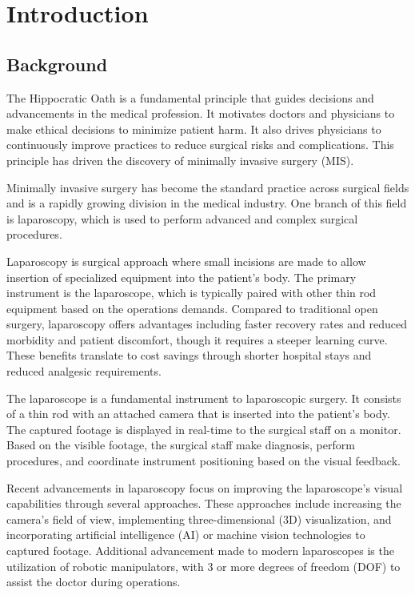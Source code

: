 \chapter{Introduction}

\section{Background}
\label{sec:Background}

The Hippocratic Oath is a fundamental principle that guides decisions and advancements in the medical profession. It motivates doctors and physicians to make ethical decisions to minimize patient harm. It also drives physicians to continuously improve practices to reduce surgical risks and complications. This principle has driven the discovery of minimally invasive surgery (MIS). \citep{FIS-2021}

\vspace{0.5cm}
\noindent
Minimally invasive surgery has become the standard practice across surgical fields and is a rapidly growing division in the medical industry. One branch of this field is laparoscopy, which is used to perform advanced and complex surgical procedures. \citep{FIS-2021}

\vspace{0.5cm}
\noindent
Laparoscopy is surgical approach where small incisions are made to allow insertion of specialized equipment into the patient’s body. The primary instrument is the laparoscope, which is typically paired with other thin rod equipment based on the operations demands.  Compared to traditional open surgery, laparoscopy offers advantages including faster recovery rates and reduced morbidity and patient discomfort, though it requires a steeper learning curve. These benefits translate to cost savings through shorter hospital stays and reduced analgesic requirements. \citep{AIP-2018}

\vspace{0.5cm}
\noindent
The laparoscope is a fundamental instrument to laparoscopic surgery. It consists of a thin rod with an attached camera that is inserted into the patient’s body. The captured footage is displayed in real-time to the surgical staff on a monitor. Based on the visible footage, the surgical staff make diagnosis, perform procedures, and coordinate instrument positioning based on the visual feedback. \citep{FIS-2021}

\vspace{0.5cm}
\noindent
Recent advancements in laparoscopy focus on improving the laparoscope’s visual capabilities through several approaches. These approaches include increasing the camera’s field of view, implementing three-dimensional (3D) visualization, and incorporating artificial intelligence (AI) or machine vision technologies to captured footage. Additional advancement made to modern laparoscopes is the utilization of robotic manipulators, with 3 or more degrees of freedom (DOF) to assist the doctor during operations. \citep{AIP-2018}

